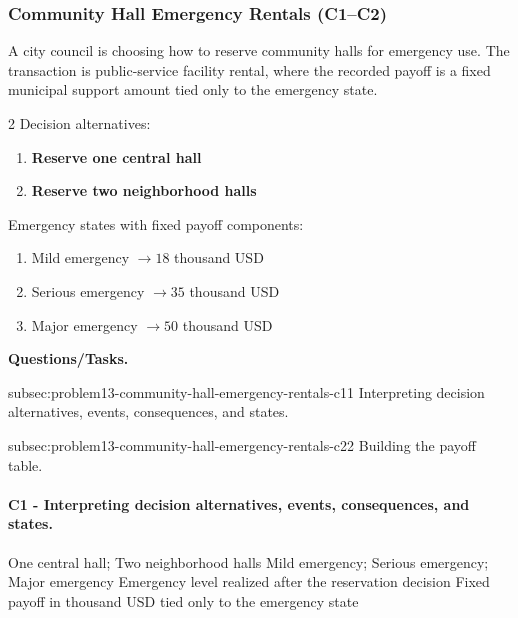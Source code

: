 
	\subsubsection{Community Hall Emergency Rentals (C1--C2)}
	\label{sec:problem13-community-hall-emergency-rentals-c1-c2}
	A city council is choosing how to reserve community halls for emergency use. The transaction is public-service facility rental, where the recorded payoff is a fixed municipal support amount tied only to the emergency state.

	\begin{multicols}{2}
		Decision alternatives:
		\begin{enumerate}[label=\arabic*.]
			\item \textbf{Reserve one central hall}
			\item \textbf{Reserve two neighborhood halls}
		\end{enumerate}

			\columnbreak

		Emergency states with fixed payoff components:
		\begin{enumerate}[label=\arabic*.]
			\item Mild emergency $\to 18$ thousand USD
			\item Serious emergency $\to 35$ thousand USD
			\item Major emergency $\to 50$ thousand USD
		\end{enumerate}
	\end{multicols}

	\textbf{Questions/Tasks.}
	\begin{enumerate}
		\CriterionTask
		{subsec:problem13-community-hall-emergency-rentals-c1}{1}
		{Interpreting decision alternatives, events, consequences, and states.}

		\CriterionTask
		{subsec:problem13-community-hall-emergency-rentals-c2}{2}
		{Building the payoff table.}
	\end{enumerate}

	\paragraph*{C1 - Interpreting decision alternatives, events, consequences, and states.}
	\label{subsec:problem13-community-hall-emergency-rentals-c1}
	\DecisionElementsTable
	{One central hall; Two neighborhood halls}
	{Mild emergency; Serious emergency; Major emergency}
	{Emergency level realized after the reservation decision}
	{Fixed payoff in thousand USD tied only to the emergency state}

